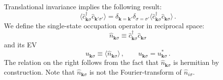 Translational invariance implies the following result:
\begin{equation}\label{eq:normal-<cc>}
	\langle \hat c_{\mathbf{k}\sigma}^\dagger \hat c_{\mathbf{k}'\sigma'} \rangle = \delta_{\mathbf{k}=\mathbf{k}'} \delta_{\sigma=\sigma'} \langle \hat c_{\mathbf{k}\sigma}^\dagger \hat c_{\mathbf{k}\sigma} \rangle \, .
\end{equation}
We define the single-state occupation operator in reciprocal space:
\[
	\hat n_{\mathbf{k}\sigma} \equiv \hat c_{\mathbf{k}\sigma}^\dagger \hat c_{\mathbf{k}\sigma}
\]
and its EV
\begin{equation}\label{eq:normal-uqsigma-def}
	u_{\mathbf{k}\sigma} \equiv \langle
		\hat n_{\mathbf{k}\sigma}
	\rangle \, ,
	\qquad
	u_{\mathbf{k}\sigma} = u_{\mathbf{k}\sigma}^* \, .
\end{equation}
The relation on the right follows from the fact that $\hat n_{\mathbf{k}\sigma}$ is hermitian by construction. Note that $\hat n_{\mathbf{k}\sigma}$ is not the Fourier-transform of $\hat n_{i\sigma}$.

